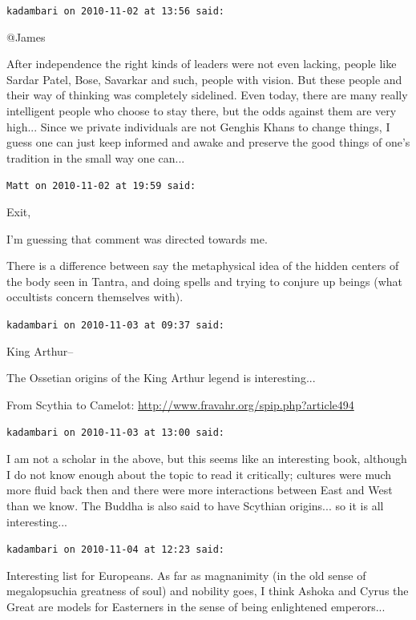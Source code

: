 \begin{footnotesize}
\begin{sffamily}
\hfill

\texttt{kadambari on 2010-11-02 at 13:56 said:}

@James

After independence the right kinds of leaders were not even lacking, people like Sardar Patel, Bose, Savarkar and such, people with vision. But these people and their way of thinking was completely sidelined. Even today, there are many really intelligent people who choose to stay there, but the odds against them are very high... Since we private individuals are not Genghis Khans to change things, I guess one can just keep informed and awake and preserve the good things of one's tradition in the small way one can... 

\hfill

\texttt{Matt on 2010-11-02 at 19:59 said:}

Exit,

I'm guessing that comment was directed towards me.

There is a difference between say the metaphysical idea of the hidden centers of the body seen in Tantra, and doing spells and trying to conjure up beings (what occultists concern themselves with).

\hfill

\texttt{kadambari on 2010-11-03 at 09:37 said:}

King Arthur--

The Ossetian origins of the King Arthur legend is interesting... 

From Scythia to Camelot:
\url{http://www.fravahr.org/spip.php?article494}


\hfill

\texttt{kadambari on 2010-11-03 at 13:00 said:}

I am not a scholar in the above, but this seems like an interesting book, although I do not know enough about the topic to read it critically; cultures were much more fluid back then and there were more interactions between East and West than we know. The Buddha is also said to have Scythian origins... so it is all interesting... 

\hfill

\texttt{kadambari on 2010-11-04 at 12:23 said:}

Interesting list for Europeans. As far as magnanimity (in the old sense of megalopsuchia greatness of soul) and nobility goes, I think Ashoka and Cyrus the Great are models for Easterners in the sense of being enlightened emperors... 

\hfill

\end{sffamily}
\end{footnotesize}

